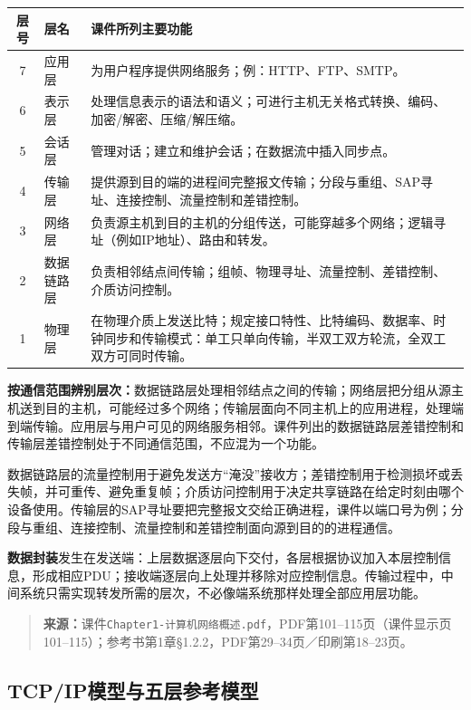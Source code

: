 \begin{center}
\begin{tabularx}{0.98\textwidth}{c l X}
\toprule
层号 & 层名 & 课件所列主要功能\\
\midrule
7 & 应用层 & 为用户程序提供网络服务；例：HTTP、FTP、SMTP。\\
6 & 表示层 & 处理信息表示的语法和语义；可进行主机无关格式转换、编码、加密/解密、压缩/解压缩。\\
5 & 会话层 & 管理对话；建立和维护会话；在数据流中插入同步点。\\
4 & 传输层 & 提供源到目的端的进程间完整报文传输；分段与重组、SAP寻址、连接控制、流量控制和差错控制。\\
3 & 网络层 & 负责源主机到目的主机的分组传送，可能穿越多个网络；逻辑寻址（例如IP地址）、路由和转发。\\
2 & 数据链路层 & 负责相邻结点间传输；组帧、物理寻址、流量控制、差错控制、介质访问控制。\\
1 & 物理层 & 在物理介质上发送比特；规定接口特性、比特编码、数据率、时钟同步和传输模式：单工只单向传输，半双工双方轮流，全双工双方可同时传输。\\
\bottomrule
\end{tabularx}
\end{center}

\textbf{按通信范围辨别层次：}数据链路层处理相邻结点之间的传输；网络层把分组从源主机送到目的主机，可能经过多个网络；传输层面向不同主机上的应用进程，处理端到端传输。应用层与用户可见的网络服务相邻。课件列出的数据链路层差错控制和传输层差错控制处于不同通信范围，不应混为一个功能。

数据链路层的流量控制用于避免发送方“淹没”接收方；差错控制用于检测损坏或丢失帧，并可重传、避免重复帧；介质访问控制用于决定共享链路在给定时刻由哪个设备使用。传输层的SAP寻址要把完整报文交给正确进程，课件以端口号为例；分段与重组、连接控制、流量控制和差错控制面向源到目的的进程通信。

\textbf{数据封装}发生在发送端：上层数据逐层向下交付，各层根据协议加入本层控制信息，形成相应PDU；接收端逐层向上处理并移除对应控制信息。传输过程中，中间系统只需实现转发所需的层次，不必像端系统那样处理全部应用层功能。

\begin{quote}\small\textbf{来源：}课件\texttt{Chapter1-计算机网络概述.pdf}，PDF第101--115页（课件显示页101--115）；参考书第1章§1.2.2，PDF第29--34页／印刷第18--23页。\end{quote}
\annotationarea[4]

\subsection{TCP/IP模型与五层参考模型}

